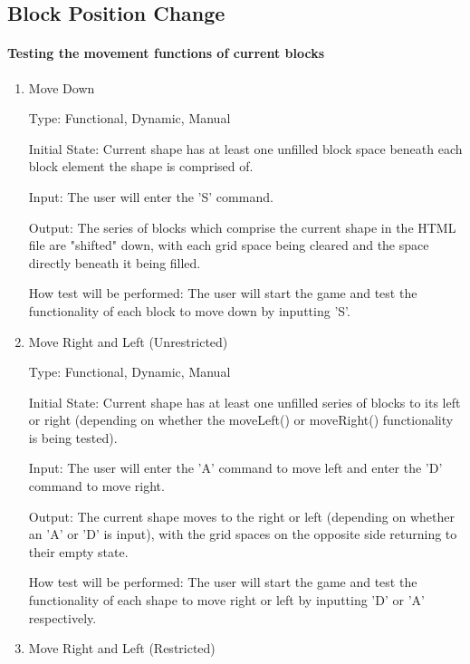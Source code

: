 \documentclass[12pt, titlepage]{article}
\begin{document}
\subsection{Block Position Change}

\paragraph{Testing the movement functions of current blocks}

\begin{enumerate}

\item{Move Down\\}

Type: Functional, Dynamic, Manual
					
Initial State: Current shape has at least one unfilled block space beneath each block element the shape is comprised of.
					
Input: The user will enter the 'S' command.
					
Output: The series of blocks which comprise the current shape in the HTML file are "shifted" down, with each grid space being cleared and the space directly beneath it being filled.
					
How test will be performed: The user will start the game and test the functionality of each block to move down by inputting 'S'.
                    
\item{Move Right and Left (Unrestricted)\\}

Type: Functional, Dynamic, Manual
					
Initial State: Current shape has at least one unfilled series of blocks to its left or right (depending on whether the moveLeft() or moveRight() functionality is being tested).
					
Input: The user will enter the 'A' command to move left and enter the 'D' command to move right.
					
Output: The current shape moves to the right or left (depending on whether an 'A' or 'D' is input), with the grid spaces on the opposite side returning to their empty state.
					
How test will be performed: The user will start the game and test the functionality of each shape to move right or left by inputting 'D' or 'A' respectively.
                    
\item{Move Right and Left (Restricted)\\}


\end{enumerate}
\end{document}
